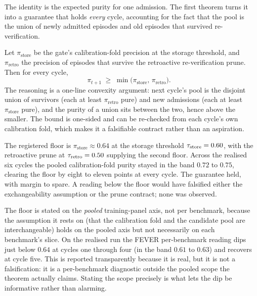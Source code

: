 The identity is the expected purity for one admission. The first theorem turns it into a
guarantee that holds \emph{every} cycle, accounting for the fact that the pool is the
union of newly admitted episodes and old episodes that survived re-verification.

\begin{precise}
Let $\pi_{\text{store}}$ be the gate's calibration-fold precision at the storage
threshold, and $\pi_{\text{retro}}$ the precision of episodes that survive the
retroactive re-verification prune. Then for every cycle,
\[
  \pi_{t+1} \;\ge\; \min\!\big(\pi_{\text{store}},\, \pi_{\text{retro}}\big).
\]
The reasoning is a one-line convexity argument: next cycle's pool is the disjoint union
of survivors (each at least $\pi_{\text{retro}}$ pure) and new admissions (each at least
$\pi_{\text{store}}$ pure), and the purity of a union sits between the two, hence above
the smaller. The bound is one-sided and can be re-checked from each cycle's own
calibration fold, which makes it a falsifiable contract rather than an aspiration.
\end{precise}

\begin{bythenumbers}
The registered floor is $\pi_{\text{store}} \approx 0.64$ at the storage threshold
$\tau_{\text{store}} = 0.60$, with the retroactive prune at $\tau_{\text{retro}} = 0.50$ supplying the second
floor. Across the realised six cycles the pooled calibration-fold purity stayed in the
band $0.72$ to $0.75$, clearing the floor by eight to eleven points at every cycle. The
guarantee held, with margin to spare. A reading below the floor would have falsified
either the exchangeability assumption or the prune contract; none was observed.
\end{bythenumbers}

\begin{pitfall}
The floor is stated on the \emph{pooled} training-panel axis, not per benchmark, because
the assumption it rests on (that the calibration fold and the candidate pool are
interchangeable) holds on the pooled axis but not necessarily on each benchmark's slice.
On the realised run the FEVER per-benchmark reading dips just below $0.64$ at cycles one
through four (in the band $0.61$ to $0.63$) and recovers at cycle five. This is reported
transparently because it is real, but it is not a falsification: it is a per-benchmark
diagnostic outside the pooled scope the theorem actually claims. Stating the scope
precisely is what lets the dip be informative rather than alarming.
\end{pitfall}

